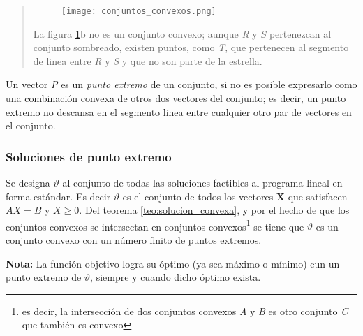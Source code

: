 \begin{quote}
  \begin{figure}[ht]
    \centering
    \texttt{[image: conjuntos\_convexos.png]}
    \caption{}
    \label{fig:conjuntos_convexos}
  \end{figure}
  La figura \ref{fig:conjuntos_convexos}b no es un conjunto convexo; aunque \textit{R} y \textit{S} pertenezcan al conjunto sombreado, existen puntos, como \textit{T}, que pertenecen al segmento de linea entre \textit{R} y \textit{S} y que no son parte de la estrella.
\end{quote}

Un vector \textit{P} es un \textit{punto extremo} de un conjunto, si no es posible expresarlo como una combinación convexa de otros dos vectores del conjunto; es decir, un punto extremo no descansa en el segmento linea entre cualquier otro par de vectores en el conjunto.

\begin{quote}
\end{quote}

\label{teo:combinacion_convexa_de_puntos_extremos}

\label{teo:solucion_convexa}

\subsubsection{Soluciones de punto extremo}

Se designa \(\vartheta\) al conjunto de todas las soluciones factibles al programa lineal en forma estándar. Es decir \(\vartheta\) es el conjunto de todos los vectores \textbf{X} que satisfacen \(AX = B\) y \(X\geq 0\). Del teorema \ref{teo:solucion_convexa}, y por el hecho de que los conjuntos convexos se intersectan en conjuntos convexos\footnote{es decir, la intersección de dos conjuntos convexos \textit{A} y \textit{B} es otro conjunto \textit{C} que también es convexo} se tiene que \(\vartheta\) es un conjunto convexo con un número finito de puntos extremos.

\textbf{Nota:} La función objetivo logra su óptimo (ya sea máximo o mínimo) eun un punto extremo de \(\vartheta\), siempre y cuando dicho óptimo exista.